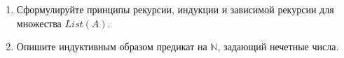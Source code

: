 \begin{enumerate}
\item Сформулируйте принципы рекурсии, индукции и зависимой рекурсии для множества $List(A)$.

\item Опишите индуктивным образом предикат на $\mathbb{N}$, задающий нечетные числа.

\end{enumerate}

